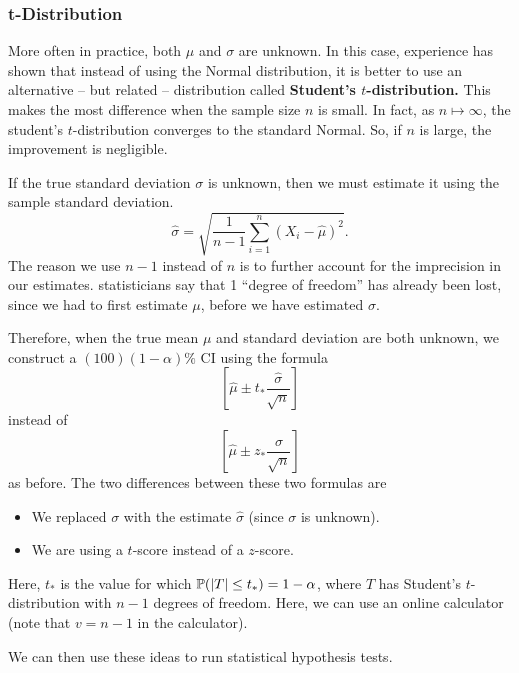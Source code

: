 \documentclass[letterpaper]{article}
\begin{document}
\subsubsection{t-Distribution}
More often in practice, both $\mu$ and $\sigma$ are unknown. In this case, experience has shown that instead of using the Normal distribution, it is better to use an alternative -- but related -- distribution called \textbf{Student's $t$-distribution.} This makes the most difference when the sample size $n$ is small. In fact, as $n \mapsto \infty$, the student's $t$-distribution converges to the standard Normal. So, if $n$ is large, the improvement is negligible. 

\bigskip 

If the true standard deviation $\sigma$ is unknown, then we must estimate it using the sample standard deviation. 
\[\hat{\sigma} = \sqrt{\frac{1}{n - 1} \sum_{i = 1}^{n} (X_i - \hat{\mu})^2}.\]
The reason we use $n - 1$ instead of $n$ is to further account for the imprecision in our estimates. statisticians say that 1 ``degree of freedom'' has already been lost, since we had to first estimate $\mu$, before we have estimated $\sigma$. 

\bigskip 

Therefore, when the true mean $\mu$ and standard deviation are both unknown, we construct a $(100)(1 - \alpha)\%$ CI using the formula 
\[\left[\hat{\mu} \pm t_* \frac{\hat{\sigma}}{\sqrt{n}} \right]\]
instead of 
\[\left[\hat{\mu} \pm z_* \frac{\sigma}{\sqrt{n}}\right]\]
as before. The two differences between these two formulas are 
\begin{itemize}
    \item We replaced $\sigma$ with the estimate $\hat{\sigma}$ (since $\sigma$ is unknown).
    \item We are using a $t$-score instead of a $z$-score.
\end{itemize}
Here, $t_*$ is the value for which $\mathbb{P}(|T| \leq t_*) = 1 - \alpha$, where $T$ has Student's $t$-distribution with $n - 1$ degrees of freedom. Here, we can use an online calculator (note that $v = n - 1$ in the calculator).

\bigskip 

We can then use these ideas to run statistical hypothesis tests.
\end{document}
